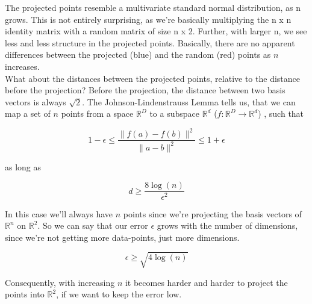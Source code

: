 \documentclass[a4paper, 11pt]{article} %
\begin{document}
The projected points resemble a multivariate standard normal distribution, as n grows. This is not entirely surprising, as we're basically multiplying the n x n identity matrix with a random matrix of size n x 2. Further, with larger n, we see less and less structure in the projected points. Basically, there are no apparent differences between the projected (blue) and the random (red) points as $n$ increases. \\

What about the distances between the projected points, relative to the distance before the projection? Before the projection, the distance between two basis vectors is always $\sqrt{2}$. The Johnson-Lindenstrauss Lemma tells us, that we can map a set of $n$ points from a space $\mathbb{R}^D$ to a subspace $\mathbb{R}^d$ ($f: \mathbb{R}^D \rightarrow \mathbb{R}^d$) , such that 

\begin{equation*}
1- \epsilon \leq \frac{\| f(a) - f(b) \|^2}{\| a - b \|^2} \leq 1 + \epsilon
\end{equation*}

as long as 

$$d \geq \frac{8\log(n)}{\epsilon^2}$$

In this case we'll always have $n$ points since we're projecting the basis vectors of $\mathbb{R}^n$ on $\mathbb{R}^2$. So we can say that our error $\epsilon$ grows with the number of dimensions, since we're not getting more data-points, just more dimensions.

$$\epsilon \geq \sqrt{4 \log(n)}$$

Consequently, with increasing $n$ it becomes harder and harder to project the points into $\mathbb{R}^2$, if we want to keep the error low.
\end{document}

